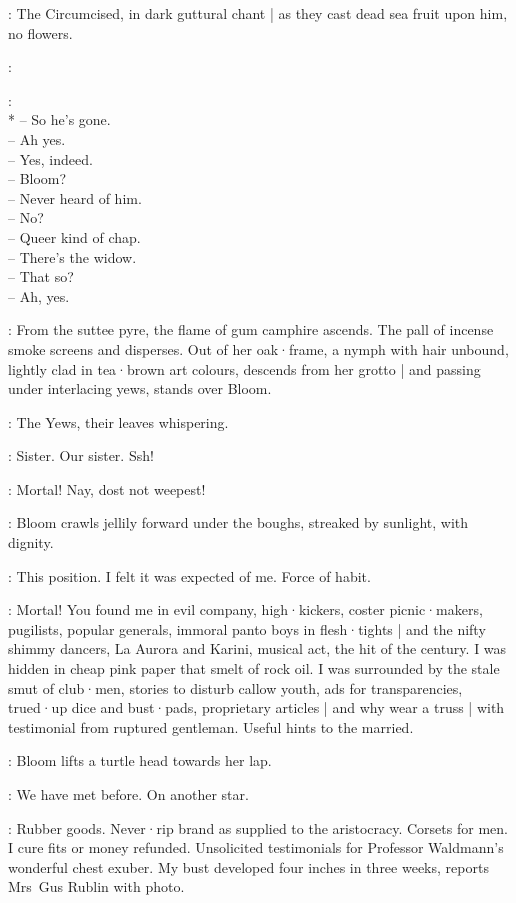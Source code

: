 :
The Circumcised,
in dark guttural chant |
as they cast dead sea fruit upon him,
no flowers.

\Circumcised:

\Voices:
\\*
-- So he's gone.\\
-- Ah yes.\\
-- Yes, indeed.\\
-- Bloom?\\
-- Never heard of him.\\
-- No?\\
-- Queer kind of chap.\\
-- There's the widow.\\
-- That so?\\
-- Ah, yes.

:
From the suttee pyre,
the flame of gum camphire ascends.
The pall of incense smoke screens and disperses.
Out of her oak·frame,
a nymph with hair unbound,
lightly clad in tea·brown art colours,
descends from her grotto |
and passing under interlacing yews,
stands over Bloom.

:
The Yews,
their leaves whispering.

\Yews:
Sister.
Our sister.
Ssh!

\Nymph[3b]:
Mortal!
Nay,
dost not weepest!

:
Bloom crawls jellily forward under the boughs,
streaked by sunlight,
with dignity.

\Bloom:
This position.
I felt it was expected of me.
Force of habit.

\Nymph:
Mortal!
You found me in evil company,
high·kickers,
coster picnic·makers,
pugilists,
popular generals,
immoral panto boys in flesh·tights |
and the nifty shimmy dancers,
La Aurora and Karini,
musical act,
the hit of the century.
I was hidden in cheap pink paper that smelt of rock oil.
I was surrounded by the stale smut of club·men,
stories to disturb callow youth,
ads for transparencies,
trued·up dice and bust·pads,
proprietary articles |
%
and why wear a truss |
with testimonial from ruptured gentleman.
Useful hints to the married.

:
Bloom lifts a turtle head towards her lap.

\Bloom:
We have met before.
On another star.

\Nymph:
Rubber goods.
Never·rip brand as supplied to the aristocracy.
Corsets for men.
I cure fits or money refunded.
Unsolicited testimonials for Professor Waldmann's wonderful chest exuber.
My bust developed four inches in three weeks,
reports Mrs~Gus Rublin with photo.

